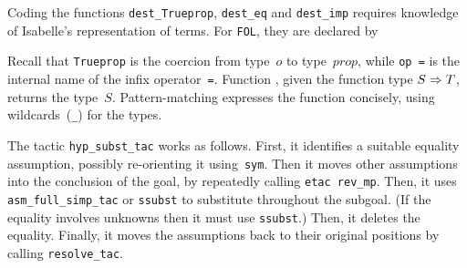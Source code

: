 Coding the functions \texttt{dest_Trueprop}, \texttt{dest_eq} and
\texttt{dest_imp} requires knowledge of Isabelle's representation of terms.
For \texttt{FOL}, they are declared by
Recall that \texttt{Trueprop} is the coercion from type~$o$ to type~$prop$,
while \hbox{\tt op =} is the internal name of the infix operator~\texttt{=}.
Function , given the function type $S\Rightarrow T$, returns
the type~$S$.  Pattern-matching expresses the function concisely, using
wildcards~({\tt_}) for the types.

The tactic \texttt{hyp_subst_tac} works as follows.  First, it identifies a
suitable equality assumption, possibly re-orienting it using~\texttt{sym}.
Then it moves other assumptions into the conclusion of the goal, by repeatedly
calling \texttt{etac~rev_mp}.  Then, it uses \texttt{asm_full_simp_tac} or
\texttt{ssubst} to substitute throughout the subgoal.  (If the equality
involves unknowns then it must use \texttt{ssubst}.)  Then, it deletes the
equality.  Finally, it moves the assumptions back to their original positions
by calling \hbox{\tt resolve_tac}.



